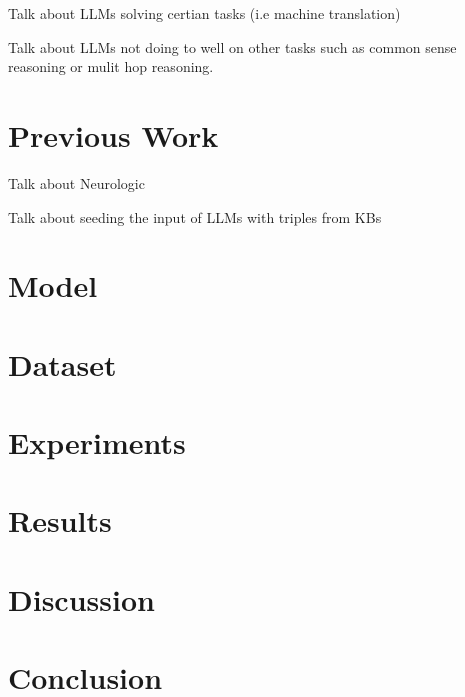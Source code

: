 \documentclass[sigplan,screen]{acmart}
\begin{document}
Talk about LLMs solving certian tasks (i.e machine translation)

Talk about LLMs not doing to well on other tasks such as common sense reasoning or mulit hop reasoning. 

\section{Previous Work}

Talk about Neurologic

Talk about seeding the input of LLMs with triples from KBs

\section{Model}

\section{Dataset}

\section{Experiments}

\section{Results}

\section{Discussion}

\section{Conclusion}
\end{document}
